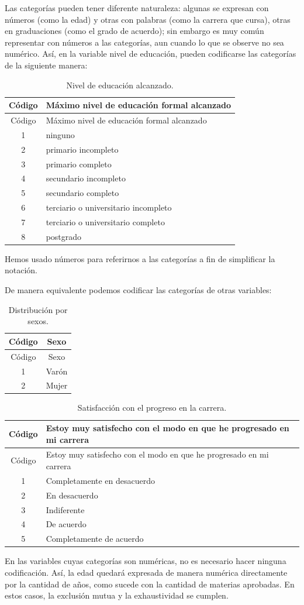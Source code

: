 \documentclass[]{book}
\begin{document}
Las categorías pueden tener diferente naturaleza: algunas se expresan con números (como la edad) y otras con palabras (como la carrera que cursa), otras en graduaciones (como el grado de acuerdo); sin embargo es muy común representar con números a las categorías, aun cuando lo que se observe no sea numérico. Así, en la variable nivel de educación, pueden codificarse las categorías de la siguiente manera:

\begin{longtable}[]{@{}cl@{}}
\caption{\label{tab:unnamed-chunk-5}Nivel de educación alcanzado.}\tabularnewline
\toprule
Código & Máximo nivel de educación formal alcanzado\tabularnewline
\midrule
\endfirsthead
\toprule
Código & Máximo nivel de educación formal alcanzado\tabularnewline
\midrule
\endhead
1 & ninguno\tabularnewline
2 & primario incompleto\tabularnewline
3 & primario completo\tabularnewline
4 & secundario incompleto\tabularnewline
5 & secundario completo\tabularnewline
6 & terciario o universitario incompleto\tabularnewline
7 & terciario o universitario completo\tabularnewline
8 & postgrado\tabularnewline
\bottomrule
\end{longtable}

Hemos usado números para referirnos a las categorías a fin de simplificar la notación.

De manera equivalente podemos codificar las categorías de otras variables:

\begin{longtable}[]{@{}cc@{}}
\caption{\label{tab:unnamed-chunk-6}Distribución por sexos.}\tabularnewline
\toprule
Código & Sexo\tabularnewline
\midrule
\endfirsthead
\toprule
Código & Sexo\tabularnewline
\midrule
\endhead
1 & Varón\tabularnewline
2 & Mujer\tabularnewline
\bottomrule
\end{longtable}

\begin{longtable}[]{@{}cl@{}}
\caption{\label{tab:unnamed-chunk-7}Satisfacción con el progreso en la carrera.}\tabularnewline
\toprule
Código & Estoy muy satisfecho con el modo en que he progresado en mi carrera\tabularnewline
\midrule
\endfirsthead
\toprule
Código & Estoy muy satisfecho con el modo en que he progresado en mi carrera\tabularnewline
\midrule
\endhead
1 & Completamente en desacuerdo\tabularnewline
2 & En desacuerdo\tabularnewline
3 & Indiferente\tabularnewline
4 & De acuerdo\tabularnewline
5 & Completamente de acuerdo\tabularnewline
\bottomrule
\end{longtable}

En las variables cuyas categorías son numéricas, no es necesario hacer ninguna codificación. Así, la edad quedará expresada de manera numérica directamente por la cantidad de años, como sucede con la cantidad de materias aprobadas. En estos casos, la exclusión mutua y la exhaustividad se cumplen.
\end{document}
